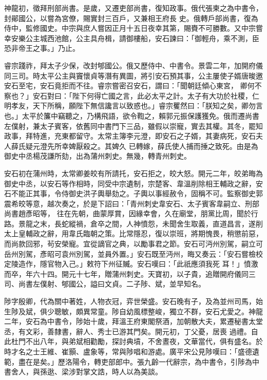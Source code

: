 \begin{pinyinscope}
 神龍初，徵拜刑部尚書。是歲，又遷吏部尚書，復知政事。俄代張柬之為中書令，封鄖國公，以嘗為宮僚，賜實封三百戶，又兼相王府長
 史。俄轉戶部尚書，復為侍中，監修國史。中宗與庶人嘗因正月十五日夜幸其第，賜賚不可勝數。又中宗嘗幸安樂公主城西池館，公主具舟楫，請御樓船，安石諫曰：「御輕舟，乘不測，臣恐非帝王之事。」乃止。



 睿宗踐祚，拜太子少保，改封郇國公。俄又歷侍中、中書令。景雲二年，加開府儀同三司。時太平公主與竇懷貞等潛有異圖，將引安石預其事，公主屢使子婿唐晙邀安石至宅，安石竟拒而不往。睿宗嘗密召安石，謂曰：「聞朝廷傾心東宮，
 卿何不察也？」安石對曰：「陛下何得亡國之言，此必太平之計。太子有大功於社稷，仁明孝友，天下所稱，願陛下無信讒言以致惑也。」睿宗矍然曰：「朕知之矣，卿勿言也。」太平於簾中竊聽之，乃構飛語，欲令鞫之，賴郭元振保護獲免。俄而遷尚書左僕射，兼太子賓客，依舊同中書門下三品，雖假以崇寵，實去其權。其冬，罷知政事，拜特進，充東都留守。太常主簿李元澄，即安石之子婿，其妻病死，安石夫人薛氏疑元澄先所幸婢厭殺之。其婢久
 已轉嫁，薛氏使人捕而捶之致死。由是為御史中丞楊茂謙所劾，出為蒲州刺史。無幾，轉青州刺史。



 安石初在蒲州時，太常卿姜皎有所請托，安石拒之，皎大怒。開元二年，皎弟晦為御史中丞，以安石等作相時，同受中宗遺制，宗楚客、韋溫削除相王輔政之辭，安石不能正其事，令侍御史洪子輿舉劾之。子輿以事經赦令，固稱不可。監察御史郭震希皎等意，越次奏之，於是下詔曰：「青州刺史韋安石、太子賓客韋嗣立、刑部尚書趙彥昭等，
 往在先朝，曲蒙厚賞，因緣幸會，久在廟堂，朋黨比周，聞於行路。景龍之末，長蛇縱禍，倉卒之間，人神憤怨，未聞舍生取義，直道昌言，遂削太上皇輔政之辭，用韋氏臨朝之策。比常隱忍，復以崇班，將期愧畏，稍懲前惡，而尚款回邪，茍安榮寵。宜從謫官之典，以勵事君之節。安石可沔州別駕，嗣立可岳州別駕，彥昭可袁州別駕，並員外置。」安石既至沔州，晦又奏云：「安石嘗檢校定陵造作，隱官物入己。」敕符下州征贓。安石嘆曰：「此祇應須我死
 耳！」憤激而卒，年六十四。開元十七年，贈蒲州刺史。天寶初，以子貴，追贈開府儀同三司、尚書左僕射、郇國公，謚曰文貞。二子陟、斌，並早知名。



 陟字殷卿，代為關中著姓，人物衣冠，弈世榮盛。安石晚有子，及為並州司馬，始生陟及斌，俱少聰敏，頗異常童。陟自幼風標整峻，獨立不群，安石尤愛之。神龍二年，安石為中書令，陟始十歲，拜溫王府東閣祭酒，加朝散大夫，累遷秘書太堂丞，有文彩，善隸書，辭人、秀士已游其門矣。開元初，丁父憂，居喪
 過禮。自此杜門不出八年，與弟斌相勸勵，探討典墳，不舍晝夜，文華當代，俱有盛名。於時才名之士王維、崔顥、盧象等，常與陟唱和游處。廣平宋公見陟嘆曰：「盛德遺範，盡在是矣。」歷洛陽令，轉吏部郎中。張九齡一代辭宗，為中書令，引陟為中書舍人，與孫逖、梁涉對掌文誥，時人以為美談。




\end{pinyinscope}
